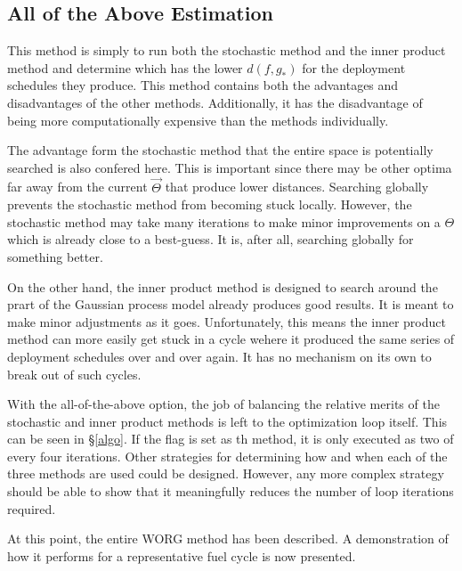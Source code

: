 \subsection{All of the Above Estimation}
\label{all}

This method is simply to run both the stochastic method and the inner product
method and determine which has the lower $d(f, g_*)$ for the deployment 
schedules they produce.  This method contains both the advantages and 
disadvantages of the other methods.  Additionally, it has the disadvantage 
of being more computationally expensive than the methods individually.

The advantage form the stochastic method that the entire space is potentially 
searched is also confered here.  This is important since there may be other
optima far away from the current $\vec{\Theta}$ that produce lower distances.
Searching globally prevents the stochastic method from becoming stuck locally.
However, the stochastic method may take many iterations to 
make minor improvements on a $\Theta$ which is already close to a best-guess.
It is, after all, searching globally for something better.

On the other hand, the inner product method is designed to search around 
the prart of the Gaussian process model already produces good results. It
is meant to make minor adjustments as it goes.  Unfortunately, this means
the inner product method can more easily get stuck in a cycle  wehere it 
produced the same series of deployment schedules over and over again. 
It has no mechanism on its own to break out of such cycles.

With the all-of-the-above option, the job of balancing the relative merits
of the stochastic and inner product methods is left to the optimization 
loop itself.  This can be seen in \S\ref{algo}.  If the \allflag flag 
is set as th method, it is only executed as \allflag two of every four 
iterations.  Other strategies for determining how and when each of the 
three methods are used could be designed. However, any more complex strategy 
should be able to show that it meaningfully reduces the number of loop 
iterations required.

At this point, the entire WORG method has been described. A
demonstration of how it performs for a representative fuel cycle is now
presented. 